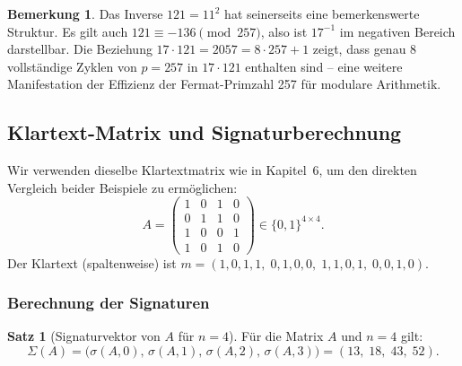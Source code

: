 ﻿\documentclass[a4paper,12pt]{scrreprt}
\theoremstyle{definition}
\newtheorem{bemerkung}{Bemerkung}[section]
\newtheorem{satz}{Satz}[section]
\begin{document}
\begin{bemerkung}
Das Inverse $121 = 11^2$ hat seinerseits eine bemerkenswerte Struktur. Es gilt auch $121 \equiv -136 \pmod{257}$, also ist $17^{-1}$ im negativen Bereich darstellbar. Die Beziehung $17 \cdot 121 = 2057 = 8 \cdot 257 + 1$ zeigt, dass genau 8 vollständige Zyklen von $p=257$ in $17 \cdot 121$ enthalten sind -- eine weitere Manifestation der Effizienz der Fermat-Primzahl 257 für modulare Arithmetik.
\end{bemerkung}

\subsection{Klartext-Matrix und Signaturberechnung}

Wir verwenden dieselbe Klartextmatrix wie in Kapitel~6, um den direkten Vergleich beider Beispiele zu ermöglichen:
\[
A = \begin{pmatrix} 1 & 0 & 1 & 0 \\ 0 & 1 & 1 & 0 \\ 1 & 0 & 0 & 1 \\ 1 & 0 & 1 & 0 \end{pmatrix} \in \{0,1\}^{4 \times 4}.
\]
Der Klartext (spaltenweise) ist $m = (1,0,1,1,\;0,1,0,0,\;1,1,0,1,\;0,0,1,0)$.

\subsubsection{Berechnung der Signaturen}

\begin{satz}[Signaturvektor von $A$ für $n=4$]
\label{satz:sigvek2}
Für die Matrix $A$ und $n=4$ gilt:
\[
\Sigma(A) = \bigl(\sigma(A,0),\, \sigma(A,1),\, \sigma(A,2),\, \sigma(A,3)\bigr) = (13,\; 18,\; 43,\; 52).
\]
\end{satz}
\end{document}
